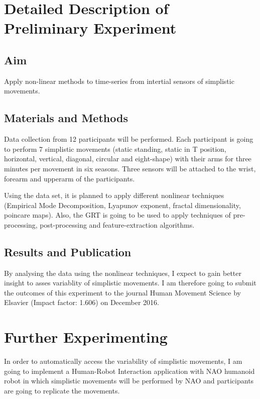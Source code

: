 \documentclass[11pt,journal,onecolumn,compsoc]{IEEEtran}
\begin{document}
\section{Detailed Description of Preliminary Experiment}

\subsection{Aim}
Apply non-linear methods to time-series from intertial sensors of 
simplistic movements.

\subsection{Materials and Methods}


Data collection from 12 participants will be performed. 
Each participant is going to 
perform 7 simplistic movements (static standing, static in T position, horizontal,
vertical, diagonal, circular and eight-shape) with their arms for three minutes per movement
in six seasons.
Three sensors will be attached to the wrist, forearm and upperarm of the participants.

Using the data set, it is planned to apply different nonlinear techniques 
(Empirical Mode Decomposition, Lyapunov exponent, fractal dimensionality, poincare maps).
Also, the GRT is going to be used to apply techniques of 
pre-processing, post-processing and feature-extraction algorithms.

\subsection{Results and Publication}

By analysing the data using the nonlinear techniques, I expect to
gain better insight to asses variablity of simplistic movements.
I am therefore going to submit the outcomes of this experiment to
the journal Human Movement Science by Elsavier (Impact factor: 1.606) on December 2016.


\section{Further Experimenting}

In order to automatically access the variability of simplistic movements, 
I am going to implement a Human-Robot Interaction application 
with NAO humanoid robot \cite{NAO}
in which simplistic movements will be performed by NAO 
and participants are going to replicate the movements.
\end{document}
